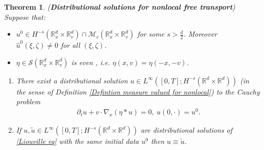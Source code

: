 \documentclass[11pt,reqno]{amsart}
\newtheorem{thm}{Theorem}[section]
\numberwithin{equation}{section}
\begin{document}
\begin{thm}
\textup{(\textbf{Distributional solutions for nonlocal free transport})}\label{Measure valued solution to Liouville eq}\\
Suppose that:  
\begin{itemize}
    \item $u^{0}\in H^{-s}(
    \mathbb{R}^{d}_{x}\times \mathbb{R}^{d}_{v})\cap \mathcal{M}_{c}(\mathbb{R}^{d}_{x}\times \mathbb{R}^{d}_{v})$ for some $s>\frac{d}{2}$. Moreover  $\widehat{u}^{0}(\xi,\zeta)\neq 0$ for all $(\xi,\zeta)$. 
    \item $\eta\in \mathcal{S}(\mathbb{R}^{d}_{x}\times \mathbb{R}^{d}_{v})$ is even , i.e. $\eta(x,v)=\eta(-x,-v)$.  
\end{itemize}
\begin{enumerate}
    \item There exist a  distributional solution $u\in L^{\infty}([0,T];H^{-s}(\mathbb{R}^{d}\times \mathbb{R}^{d}))$ (in the sense of Definition \ref{Defintion measure valued for nonlocal}) to the  Cauchy problem
\begin{align}
\partial_{t}u+v\cdot \nabla_{x}(\eta\ast u)=0, \ u(0,\cdot)=u^{0}.  \label{Liouville eq}  \end{align}
\item If $u,\widetilde{u}\in L^{\infty}([0,T];H^{-s}(\mathbb{R}^{d}\times \mathbb{R}^{d}))$ are distributional solutions of \eqref{Liouville eq} with the same initial data $u^{0}$ then $u\equiv \widetilde{ u}$.
\end{enumerate}
\end{thm}
\end{document}
